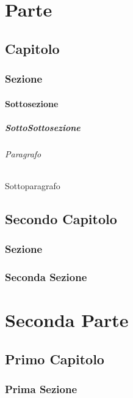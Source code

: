 \documentclass{book}
\begin{document}
	
	\part{Parte}
	\chapter{Capitolo}
	\section{Sezione}
	\subsection{Sottosezione}
	\subsubsection{SottoSottosezione}
	\paragraph{Paragrafo}
	\subparagraph{Sottoparagrafo}
	
	\chapter{Secondo Capitolo}
	\section{Sezione}
	\section{Seconda Sezione}
	
	\part{Seconda Parte}
	\chapter{Primo Capitolo}
	\section{Prima Sezione}
	
\end{document}
